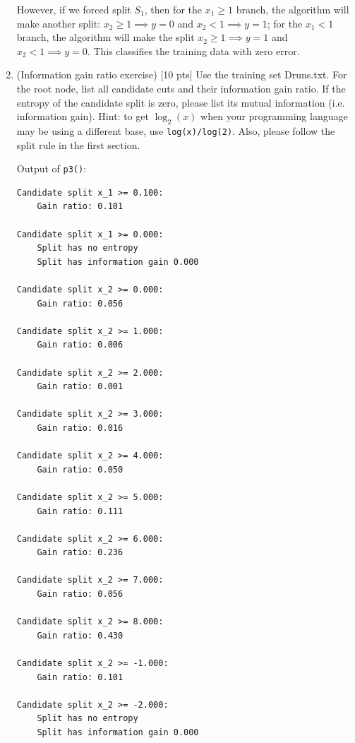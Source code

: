 \documentclass[a4paper]{article}
\theoremstyle{definition}
\newenvironment{soln}{
    \leavevmode\color{blue}\ignorespaces
}{}
\begin{document}
\begin{enumerate}
\begin{soln}
          However, if we forced split $S_{1}$, then for the $x_{1}\ge 1$ branch, the algorithm will make another split: $x_{2}\ge 1\implies y=0$ and $x_{2}<1\implies y=1$; for the $x_{1}<1$ branch, the algorithm will make the split $x_{2}\ge 1\implies y=1$ and $x_{2}<1\implies y=0$. This classifies the training data with zero error.
        \end{soln}


  \item (Information gain ratio exercise)  [10 pts] Use the training set Druns.txt.  For the root node, list all candidate cuts and their information gain ratio. If the entropy of the candidate split is zero, please list its mutual information (i.e. information gain). Hint: to get $\log_2(x)$ when your programming language may be using a different base, use \verb|log(x)/log(2)|. Also, please follow the split rule in the first section. \\

        \begin{soln}
          Output of \verb|p3()|:

\begin{verbatim}
Candidate split x_1 >= 0.100:
    Gain ratio: 0.101

Candidate split x_1 >= 0.000:
    Split has no entropy
    Split has information gain 0.000

Candidate split x_2 >= 0.000:
    Gain ratio: 0.056

Candidate split x_2 >= 1.000:
    Gain ratio: 0.006

Candidate split x_2 >= 2.000:
    Gain ratio: 0.001

Candidate split x_2 >= 3.000:
    Gain ratio: 0.016

Candidate split x_2 >= 4.000:
    Gain ratio: 0.050

Candidate split x_2 >= 5.000:
    Gain ratio: 0.111

Candidate split x_2 >= 6.000:
    Gain ratio: 0.236

Candidate split x_2 >= 7.000:
    Gain ratio: 0.056

Candidate split x_2 >= 8.000:
    Gain ratio: 0.430

Candidate split x_2 >= -1.000:
    Gain ratio: 0.101

Candidate split x_2 >= -2.000:
    Split has no entropy
    Split has information gain 0.000
\end{verbatim}

        \end{soln}


\end{enumerate}
\end{document}
